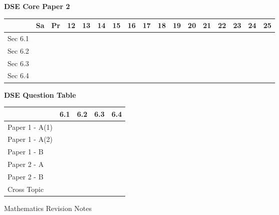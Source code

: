 \documentclass[12pt, a4paper]{article}
\begin{document}
\begin{absolutelynopagebreak}
\begin{center}
\textbf{DSE Core Paper 2}
\end{center}
\begin{center}
\begin{tabular}{|l|c|c|c|c|c|c|c|c|c|c|c|c|c|c|c|c|}
\hline
        & Sa & Pr & 12 & 13 & 14 & 15 & 16 & 17 & 18 & 19 & 20 & 21 & 22 & 23 & 24 & 25 \\\hline\hline
Sec 6.1 &  &  &  &  &  &  &  &  &  &  &  &  &  &  &  &  \\\hline
Sec 6.2 &  &  &  &  &  &  &  &  &  &  &  &  &  &  &  &  \\\hline
Sec 6.3 &  &  &  &  &  &  &  &  &  &  &  &  &  &  &  &  \\\hline
Sec 6.4 &  &  &  &  &  &  &  &  &  &  &  &  &  &  &  &  \\\hline
\end{tabular}
\end{center}
\end{absolutelynopagebreak}
\begin{absolutelynopagebreak}
\begin{center}
\textbf{DSE Question Table}
\end{center}
\begin{center}
\begin{tabular}{|l|c|c|c|c|}
\hline
        & 6.1 & 6.2 & 6.3 & 6.4 \\\hline
\hline
Paper 1 - A(1)&  &  &  &  \\
\hline
Paper 1 - A(2)&  &  &  &  \\
\hline
Paper 1 - B&  &  &  &  \\
\hline
\hline
Paper 2 - A&  &  &  &  \\
\hline
Paper 2 - B&  &  &  &  \\
\hline
\hline
Cross Topic&  &  &  &  \\
\hline
\end{tabular}
\end{center}
\end{absolutelynopagebreak}
\newpage
\newpage
\thispagestyle{empty}
\begin{center}
Mathematics Revision Notes\\\vspace{1cm}
\\\vspace{1cm}
{\fontsize{24pt}{24pt}\selectfont {Areas and Volumes (III)}} \\\vspace{1cm}
\label{chapter:S3-7}

\end{center}
\vspace{0.5cm}
\hline
\end{document}
